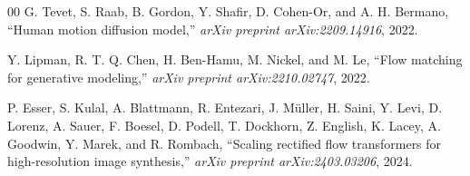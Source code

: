 \documentclass[conference]{IEEEtran}
\begin{document}
\begin{thebibliography}{00}
G. Tevet, S. Raab, B. Gordon, Y. Shafir, D. Cohen-Or, and A. H. Bermano,
``Human motion diffusion model,''
\emph{arXiv preprint arXiv:2209.14916}, 2022.

Y. Lipman, R. T. Q. Chen, H. Ben-Hamu, M. Nickel, and M. Le,
``Flow matching for generative modeling,''
\emph{arXiv preprint arXiv:2210.02747}, 2022.

P. Esser, S. Kulal, A. Blattmann, R. Entezari, J. M\"{u}ller, H. Saini, Y. Levi, D. Lorenz, A. Sauer, F. Boesel, D. Podell, T. Dockhorn, Z. English, K. Lacey, A. Goodwin, Y. Marek, and R. Rombach,
``Scaling rectified flow transformers for high-resolution image synthesis,''
\emph{arXiv preprint arXiv:2403.03206}, 2024.

\end{thebibliography}
\end{document}
